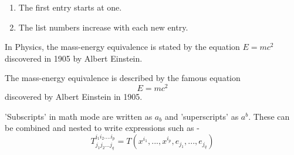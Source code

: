 \documentclass[12pt, letterpaper, twoside]{article}
\begin{document}
\begin{enumerate}
    \item The first entry starts at one. 
    \item The list numbers increase with each new entry.
\end{enumerate}



In Physics, the mass-energy equivalence is stated by the equation \begin{math}E=mc^2\end{math} discovered in 1905 by Albert Einstein.

The mass-energy equivalence is described by the famous equation
\begin{displaymath} E=mc^2 \end{displaymath} discovered by Albert Einstein in 1905.

'Subscripts' in math mode are written as \begin{math}a_b\end{math} and 'superscripts' as \begin{math}a^b\end{math}.
These can be combined and nested to write expressions such as - 
\begin{displaymath}
T^{i_1i_2....i_p}_{j_1j_2...j_q} = T(x^{i_1},...,x^{i_p},e_{j_1},...,e_{j_q})
\end{displaymath}
\end{document}

